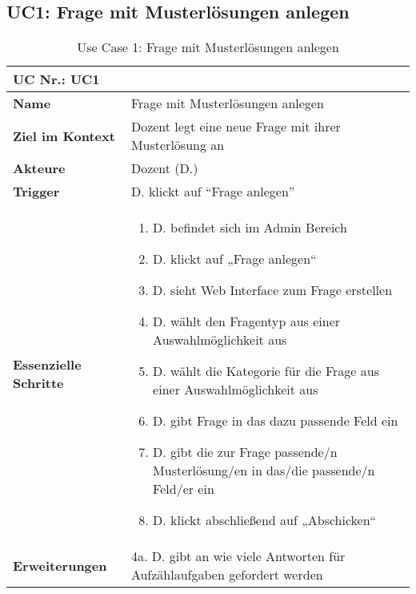\begin{table}[h] 
\subsection{UC1: Frage mit Musterlösungen anlegen}\label{uc:UC1}
	\begin{tabular}{|p{3cm}|p{11.06cm}|}
	\hline
		\multicolumn{2}{|l|}{\textbf{UC Nr.: UC1} }   \\ \hline
		\textbf{Name}                 &      Frage mit Musterlösungen anlegen   \\ \hline
		\textbf{Ziel im Kontext}      &      Dozent legt eine neue Frage mit ihrer Musterlösung an   \\ \hline
		\textbf{Akteure}              &      Dozent (D.)   \\ \hline
		\textbf{Trigger}              &      D. klickt auf "`Frage anlegen"'   \\ \hline
		\textbf{Essenzielle Schritte} & 			
			\begin{enumerate}
			  \item D. befindet sich im Admin Bereich
			  \item D. klickt auf „Frage anlegen“
			  \item D. sieht Web Interface zum Frage erstellen
			  \item	D. wählt den Fragentyp aus einer Auswahlmöglichkeit aus
			  \item D. wählt die Kategorie für die Frage aus einer Auswahlmöglichkeit aus
			  \item D. gibt Frage in das dazu passende Feld ein
			  \item D. gibt die zur Frage passende/n Musterlösung/en in das/die passende/n Feld/er ein
			  \item D. klickt abschließend auf „Abschicken“
			\end{enumerate}			
		\\ \hline
		\textbf{Erweiterungen} 		  &   4a. D. gibt an wie viele Antworten für Aufzählaufgaben gefordert werden     \\ \hline
	\end{tabular}
	\caption{Use Case 1: Frage mit Musterlösungen anlegen}
\end{table}\FloatBarrier




